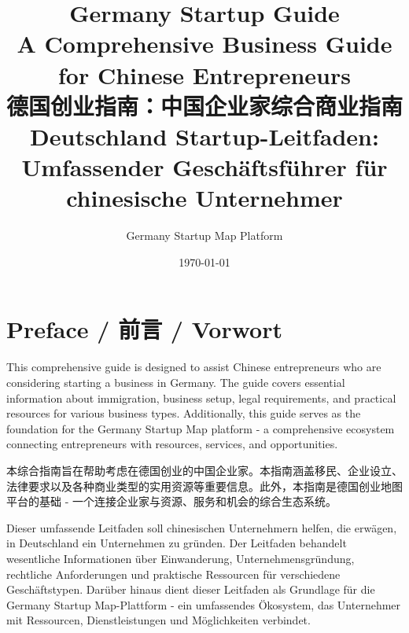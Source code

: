 \documentclass[11pt,a4paper]{book}
\title{\textbf{Germany Startup Guide}\\
\large A Comprehensive Business Guide for Chinese Entrepreneurs\\
\large 德国创业指南：中国企业家综合商业指南\\
\large Deutschland Startup-Leitfaden: Umfassender Geschäftsführer für chinesische Unternehmer}
\author{Germany Startup Map Platform}
\date{\today}
\begin{document}
\maketitle

\frontmatter

\tableofcontents
\newpage

\chapter*{Preface / 前言 / Vorwort}

This comprehensive guide is designed to assist Chinese entrepreneurs who are considering starting a business in Germany. The guide covers essential information about immigration, business setup, legal requirements, and practical resources for various business types. Additionally, this guide serves as the foundation for the Germany Startup Map platform - a comprehensive ecosystem connecting entrepreneurs with resources, services, and opportunities.

本综合指南旨在帮助考虑在德国创业的中国企业家。本指南涵盖移民、企业设立、法律要求以及各种商业类型的实用资源等重要信息。此外，本指南是德国创业地图平台的基础 - 一个连接企业家与资源、服务和机会的综合生态系统。

Dieser umfassende Leitfaden soll chinesischen Unternehmern helfen, die erwägen, in Deutschland ein Unternehmen zu gründen. Der Leitfaden behandelt wesentliche Informationen über Einwanderung, Unternehmensgründung, rechtliche Anforderungen und praktische Ressourcen für verschiedene Geschäftstypen. Darüber hinaus dient dieser Leitfaden als Grundlage für die Germany Startup Map-Plattform - ein umfassendes Ökosystem, das Unternehmer mit Ressourcen, Dienstleistungen und Möglichkeiten verbindet.

\mainmatter












\end{document}
